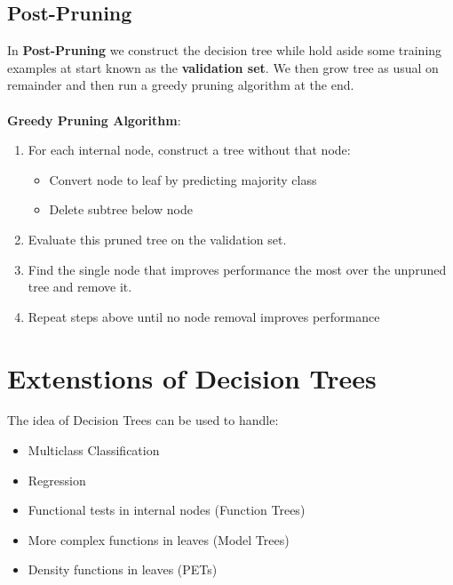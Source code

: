 \documentclass[12pt, a4paper]{book}
\begin{document}
\subsection{Post-Pruning}
In \textbf{Post-Pruning} we construct the decision tree while hold aside some training examples at start known as the \textbf{validation set}. We then grow tree as usual on remainder and then run a greedy pruning algorithm at the end.\\\\
\textbf{Greedy Pruning Algorithm}:
\begin{enumerate}
    \item For each internal node, construct a tree without that
node:
    \begin{itemize}
        \item Convert node to leaf by predicting majority class
        \item Delete subtree below node
    \end{itemize}
    \item Evaluate this pruned tree on the validation set.
    \item Find the single node that improves performance the most over the unpruned tree and remove it.
    \item Repeat steps above until no node removal improves
performance
\end{enumerate}

\section{Extenstions of Decision Trees}
The idea of Decision Trees can be used to handle:
\begin{itemize}
    \item Multiclass Classification
    \item Regression
    \item Functional tests in internal nodes (Function Trees) 
    \item More complex functions in leaves (Model Trees)
    \item Density functions in leaves (PETs)
\end{itemize}
\end{document}
